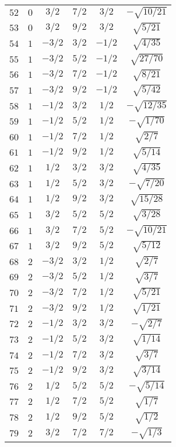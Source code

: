 \begin{table}
\begin{center}
\begin{tabular}{|c|c|c|c|c|c|}
$52$ & $0$ & $3/2$ & $7/2$ & $3/2$ & $-\sqrt{10/21}$ \\ 
$53$ & $0$ & $3/2$ & $9/2$ & $3/2$ & $\sqrt{5/21}$ \\ 
$54$ & $1$ & $-3/2$ & $3/2$ & $-1/2$ & $\sqrt{4/35}$ \\ 
$55$ & $1$ & $-3/2$ & $5/2$ & $-1/2$ & $\sqrt{27/70}$ \\ 
$56$ & $1$ & $-3/2$ & $7/2$ & $-1/2$ & $\sqrt{8/21}$ \\ 
$57$ & $1$ & $-3/2$ & $9/2$ & $-1/2$ & $\sqrt{5/42}$ \\ 
$58$ & $1$ & $-1/2$ & $3/2$ & $1/2$ & $-\sqrt{12/35}$ \\ 
$59$ & $1$ & $-1/2$ & $5/2$ & $1/2$ & $-\sqrt{1/70}$ \\ 
$60$ & $1$ & $-1/2$ & $7/2$ & $1/2$ & $\sqrt{2/7}$ \\ 
$61$ & $1$ & $-1/2$ & $9/2$ & $1/2$ & $\sqrt{5/14}$ \\ 
$62$ & $1$ & $1/2$ & $3/2$ & $3/2$ & $\sqrt{4/35}$ \\ 
$63$ & $1$ & $1/2$ & $5/2$ & $3/2$ & $-\sqrt{7/20}$ \\ 
$64$ & $1$ & $1/2$ & $9/2$ & $3/2$ & $\sqrt{15/28}$ \\ 
$65$ & $1$ & $3/2$ & $5/2$ & $5/2$ & $\sqrt{3/28}$ \\ 
$66$ & $1$ & $3/2$ & $7/2$ & $5/2$ & $-\sqrt{10/21}$ \\ 
$67$ & $1$ & $3/2$ & $9/2$ & $5/2$ & $\sqrt{5/12}$ \\ 
$68$ & $2$ & $-3/2$ & $3/2$ & $1/2$ & $\sqrt{2/7}$ \\ 
$69$ & $2$ & $-3/2$ & $5/2$ & $1/2$ & $\sqrt{3/7}$ \\ 
$70$ & $2$ & $-3/2$ & $7/2$ & $1/2$ & $\sqrt{5/21}$ \\ 
$71$ & $2$ & $-3/2$ & $9/2$ & $1/2$ & $\sqrt{1/21}$ \\ 
$72$ & $2$ & $-1/2$ & $3/2$ & $3/2$ & $-\sqrt{2/7}$ \\ 
$73$ & $2$ & $-1/2$ & $5/2$ & $3/2$ & $\sqrt{1/14}$ \\ 
$74$ & $2$ & $-1/2$ & $7/2$ & $3/2$ & $\sqrt{3/7}$ \\ 
$75$ & $2$ & $-1/2$ & $9/2$ & $3/2$ & $\sqrt{3/14}$ \\ 
$76$ & $2$ & $1/2$ & $5/2$ & $5/2$ & $-\sqrt{5/14}$ \\ 
$77$ & $2$ & $1/2$ & $7/2$ & $5/2$ & $\sqrt{1/7}$ \\ 
$78$ & $2$ & $1/2$ & $9/2$ & $5/2$ & $\sqrt{1/2}$ \\ 
$79$ & $2$ & $3/2$ & $7/2$ & $7/2$ & $-\sqrt{1/3}$ \\ 

\end{tabular}
\end{center}
\end{table}

